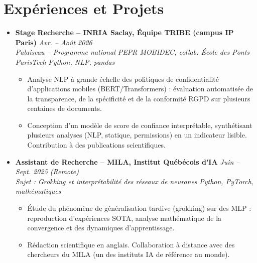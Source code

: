 \documentclass[a4paper,11pt]{article}
\begin{document}
\section{Expériences et Projets}
\begin{itemize}[leftmargin=*, label={-}]

\item \textbf{Stage Recherche -- INRIA Saclay, Équipe TRIBE (campus IP Paris)} \hfill \textit{Avr. -- Août 2026} \\
\textit{Palaiseau -- Programme national PEPR MOBIDEC, collab. École des Ponts ParisTech} \hfill \textit{Python, NLP, pandas}
\vspace{-2pt}
\begin{itemize}[leftmargin=0.4cm, nosep, label=\tiny$\bullet$]
    \item \small{Analyse NLP à grande échelle des politiques de confidentialité d'applications mobiles (BERT/Transformers) : évaluation automatisée de la transparence, de la spécificité et de la conformité RGPD sur plusieurs centaines de documents.}
    \item \small{Conception d'un modèle de score de confiance interprétable, synthétisant plusieurs analyses (NLP, statique, permissions) en un indicateur lisible. Contribution à des publications scientifiques.}
\end{itemize}
\vspace{3pt}

\item \textbf{Assistant de Recherche -- MILA, Institut Québécois d'IA} \hfill \textit{Juin -- Sept. 2025 (Remote)} \\
\textit{Sujet : Grokking et interprétabilité des réseaux de neurones} \hfill \textit{Python, PyTorch, mathématiques}
\vspace{-2pt}
\begin{itemize}[leftmargin=0.4cm, nosep, label=\tiny$\bullet$]
    \item \small{Étude du phénomène de généralisation tardive (grokking) sur des MLP : reproduction d'expériences SOTA, analyse mathématique de la convergence et des dynamiques d'apprentissage.}
    \item \small{Rédaction scientifique en anglais. Collaboration à distance avec des chercheurs du MILA (un des instituts IA de référence au monde).}
\end{itemize}
\vspace{3pt}


\end{itemize}
\end{document}
